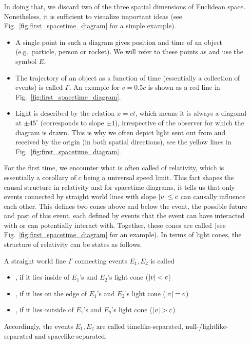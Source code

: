 \documentclass[../relativity_main.tex]{subfiles}
\begin{document}
In doing that, we discard two of the three spatial dimensions of Euclidean space. Nonetheless, it is sufficient to visualize important ideas (see Fig.~\ref{fig:first_spacetime_diagram} for a simple example).
\begin{itemize}
	\item A single point in such a diagram gives position and time of an object (e.g.~particle, person or rocket). We will refer to these points as  and use the symbol $E$.


	\item The trajectory of an object as a function of time (essentially a collection of events) is called  $\Gamma$. An example for $v = 0.5 c$ is shown as a red line in Fig.~\ref{fig:first_spacetime_diagram}.


	\item Light is described by the relation $x = ct$, which means it is always a diagonal at $\pm 45^\circ$ (corresponds to slope $\pm 1$), irrespective of the observer for which the diagram is drawn. This is why we often depict light sent out from and received by the origin (in both spatial directions), see the yellow lines in Fig.~\ref{fig:first_spacetime_diagram}.
\end{itemize}

For the first time, we encounter what is often called  of relativity, which is essentially a corollary of $c$ being a universal speed limit. This fact shapes the causal structure in relativity and for spacetime diagrams, it tells us that only events connected by straight world lines with slope $\abs{v} \leq c$ can causally influence each other. This defines two cones above and below the event, the possible future and past of this event, each defined by events that the event can have interacted with or can potentially interact with. Together, these cones are called  (see Fig.~\ref{fig:first_spacetime_diagram} for an example). In terms of light cones, the structure of relativity can be states as follows.
\begin{defi}\label{defi:causality_v1}
	A straight world line $\Gamma$ connecting events $E_1, E_2$ is called
	\begin{itemize}
		\item {}, if it lies inside of $E_1$'s and $E_2$'s light cone ($\abs{v} < c$)
		
		
		\item {}, if it lies on the edge of $E_1$'s and $E_2$'s light cone ($\abs{v} = c$)
		
		
		\item {}, if it lies outside of $E_1$'s and $E_2$'s light cone ($\abs{v} > c$)
	\end{itemize}
\end{defi}
Accordingly, the events $E_1, E_2$ are called timelike-separated, null-/lightlike-separated and spacelike-separated.
\end{document}
